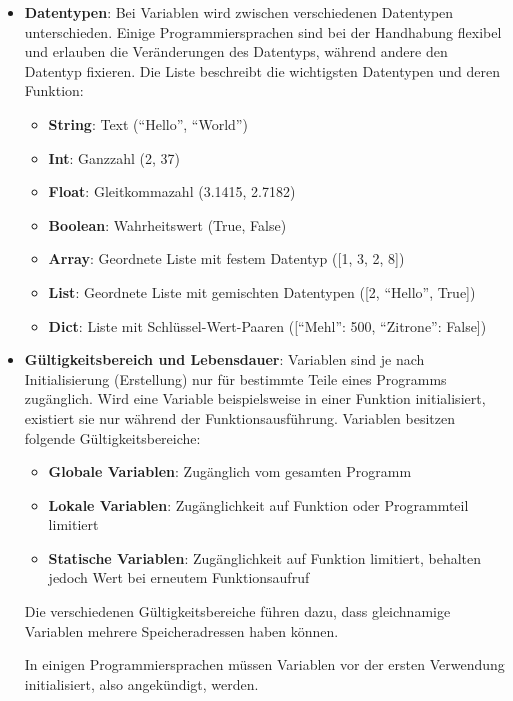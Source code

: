 \documentclass[11pt, a4paper]{article}
\begin{document}
\begin{itemize}
	\item \textbf{Datentypen}: Bei Variablen wird zwischen verschiedenen Datentypen unterschieden. Einige Programmiersprachen sind bei der Handhabung flexibel und erlauben die Veränderungen des Datentyps, während andere den Datentyp fixieren. Die Liste beschreibt die wichtigsten Datentypen und deren Funktion:
	\begin{itemize}
		\item \textbf{String}: Text (``Hello'', ``World'')
		\item \textbf{Int}: Ganzzahl (2, 37)
		\item \textbf{Float}: Gleitkommazahl (3.1415, 2.7182)
		\item \textbf{Boolean}: Wahrheitswert (True, False)
		\item \textbf{Array}: Geordnete Liste mit festem Datentyp ([1, 3, 2, 8])
		\item \textbf{List}: Geordnete Liste mit gemischten Datentypen ([2, ``Hello'', True])
		\item \textbf{Dict}: Liste mit Schlüssel-Wert-Paaren ([``Mehl'': 500, ``Zitrone'': False])
	\end{itemize}
	\item \textbf{Gültigkeitsbereich und Lebensdauer}: Variablen sind je nach Initialisierung (Erstellung) nur für bestimmte Teile eines Programms zugänglich. Wird eine Variable beispielsweise in einer Funktion initialisiert, existiert sie nur während der Funktionsausführung. Variablen besitzen folgende Gültigkeitsbereiche:
	\begin{itemize}
		\item \textbf{Globale Variablen}: Zugänglich vom gesamten Programm
		\item \textbf{Lokale Variablen}: Zugänglichkeit auf Funktion oder Programmteil limitiert
		\item \textbf{Statische Variablen}: Zugänglichkeit auf Funktion limitiert, behalten jedoch Wert bei erneutem Funktionsaufruf
	\end{itemize}
	Die verschiedenen Gültigkeitsbereiche führen dazu, dass gleichnamige Variablen mehrere Speicheradressen haben können.
	
	In einigen Programmiersprachen müssen Variablen vor der ersten Verwendung initialisiert, also angekündigt, werden. 
\end{itemize}
\end{document}

